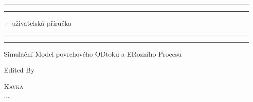 

\begin{titlepage} %

	\centering %
	
	\scshape %
	
	\vspace*{\baselineskip} %
	
	
	\rule{\textwidth}{0pt}\vspace*{-\baselineskip}\vspace*{2pt} %
	\rule{\textwidth}{0.4pt} %
	
	\vspace{0.75\baselineskip} %
	
	{\LARGE \smod\ - uživatelská příručka} %
	
	\vspace{0.75\baselineskip} %
	
	\rule{\textwidth}{0.4pt}\vspace*{-\baselineskip}\vspace{3.2pt} %
	\rule{\textwidth}{0pt} %
	
	\vspace{2\baselineskip} %
	
	
	Simulační Model povrchového ODtoku a ERozního Procesu 
	
	\vspace*{3\baselineskip} %
	
	
	Edited By
	
	\vspace{0.5\baselineskip} %
	
	{\scshape\Large Kavka \\ ... \\} %
	

\end{titlepage}
